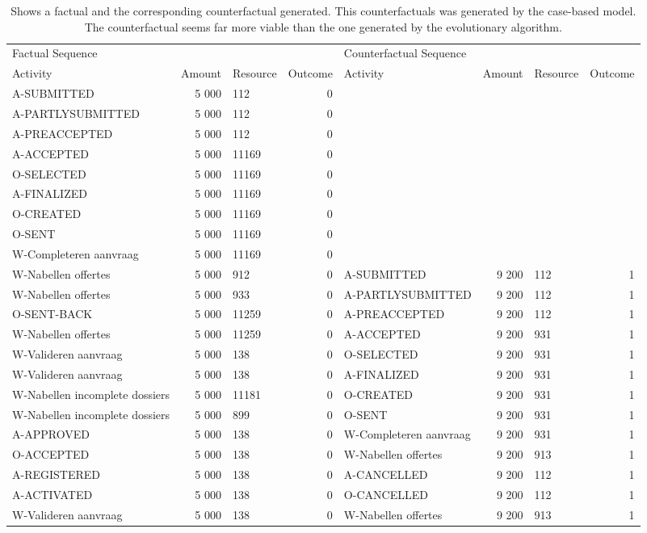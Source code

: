 \begin{table}
\caption{Shows a factual and the corresponding counterfactual generated. This counterfactuals was generated by the case-based model. The counterfactual seems far more viable than the one generated by the evolutionary algorithm.}
\label{tbl:example-cf-cbg}
\begin{tabular}{lrlrlrlr}
\toprule
\multicolumn{4}{l}{Factual Sequence} & \multicolumn{4}{l}{Counterfactual Sequence} \\
Activity & Amount & Resource & Outcome & Activity & Amount & Resource & Outcome \\
\midrule
A-SUBMITTED & 5 000 & 112 & 0 &  &  &  &  \\
A-PARTLYSUBMITTED & 5 000 & 112 & 0 &  &  &  &  \\
A-PREACCEPTED & 5 000 & 112 & 0 &  &  &  &  \\
A-ACCEPTED & 5 000 & 11169 & 0 &  &  &  &  \\
O-SELECTED & 5 000 & 11169 & 0 &  &  &  &  \\
A-FINALIZED & 5 000 & 11169 & 0 &  &  &  &  \\
O-CREATED & 5 000 & 11169 & 0 &  &  &  &  \\
O-SENT & 5 000 & 11169 & 0 &  &  &  &  \\
W-Completeren aanvraag & 5 000 & 11169 & 0 &  &  &  &  \\
W-Nabellen offertes & 5 000 & 912 & 0 & A-SUBMITTED & 9 200 & 112 & 1 \\
W-Nabellen offertes & 5 000 & 933 & 0 & A-PARTLYSUBMITTED & 9 200 & 112 & 1 \\
O-SENT-BACK & 5 000 & 11259 & 0 & A-PREACCEPTED & 9 200 & 112 & 1 \\
W-Nabellen offertes & 5 000 & 11259 & 0 & A-ACCEPTED & 9 200 & 931 & 1 \\
W-Valideren aanvraag & 5 000 & 138 & 0 & O-SELECTED & 9 200 & 931 & 1 \\
W-Valideren aanvraag & 5 000 & 138 & 0 & A-FINALIZED & 9 200 & 931 & 1 \\
W-Nabellen incomplete dossiers & 5 000 & 11181 & 0 & O-CREATED & 9 200 & 931 & 1 \\
W-Nabellen incomplete dossiers & 5 000 & 899 & 0 & O-SENT & 9 200 & 931 & 1 \\
A-APPROVED & 5 000 & 138 & 0 & W-Completeren aanvraag & 9 200 & 931 & 1 \\
O-ACCEPTED & 5 000 & 138 & 0 & W-Nabellen offertes & 9 200 & 913 & 1 \\
A-REGISTERED & 5 000 & 138 & 0 & A-CANCELLED & 9 200 & 112 & 1 \\
A-ACTIVATED & 5 000 & 138 & 0 & O-CANCELLED & 9 200 & 112 & 1 \\
W-Valideren aanvraag & 5 000 & 138 & 0 & W-Nabellen offertes & 9 200 & 913 & 1 \\
\bottomrule
\end{tabular}
\end{table}
